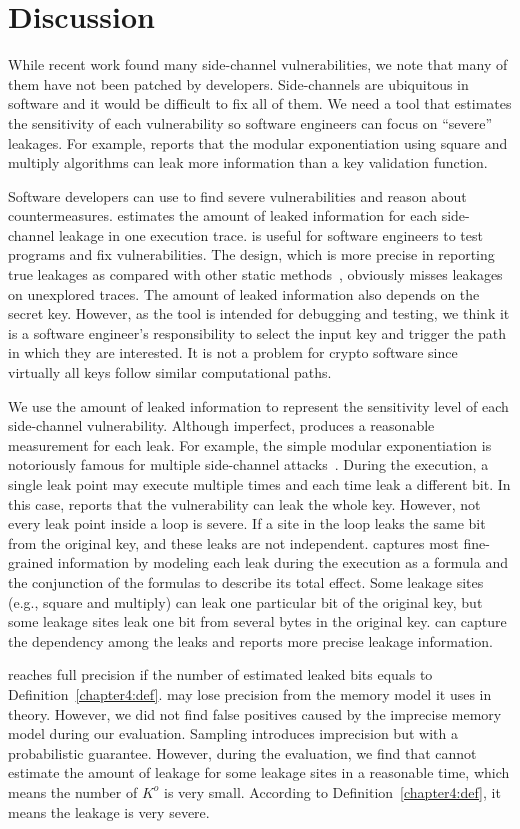 \section{Discussion}
While recent work found many side-channel vulnerabilities,
we note that many of them have not been patched by developers.
Side-channels are ubiquitous in software and it would be difficult to fix all of them.
We need a tool that estimates the sensitivity of each vulnerability
so software engineers can focus on
``severe'' leakages. For example, \tool{} reports that
the modular exponentiation using square and multiply algorithms can
leak more information than a key validation function.

Software developers can use \tool{} to find severe vulnerabilities
and reason about countermeasures.
\tool{} estimates the amount of leaked information for each side-channel leakage
in one execution trace. \tool{} is useful for software
engineers to test programs and fix vulnerabilities.
The design, which is more precise in reporting true leakages as compared with other static
methods~\cite{197207,BacelarAlmeida:2013:FVS:2483313.2483334}, obviously misses
leakages on unexplored traces. The amount of leaked information also depends on the secret key.
However, as the tool is intended for debugging and testing,
we think it is a software engineer's responsibility to select the input key and trigger
the path in which they are interested. It is not a problem for crypto software
since virtually all keys follow similar computational paths.

We use the amount of leaked information to represent the sensitivity level of
each side-channel vulnerability. Although imperfect, \tool{} produces a reasonable
measurement for each leak. For example, the simple modular exponentiation is
notoriously famous for multiple side-channel attacks~\cite{kocher1996timing}.
During the execution, a single leak point may execute multiple times
and each time leak a different bit. In this case, \tool{} reports that the
vulnerability can leak the whole key. However, not every leak point inside a
loop is severe. If a site in the loop leaks the same bit from the
original key, and these leaks are not independent. \tool{} captures most
fine-grained information by modeling each leak during the execution as a
formula and the conjunction of the formulas to describe its total effect.
Some leakage sites (e.g., square and multiply)
can leak one particular bit of the original key, but some leakage sites leak one bit
from several bytes in the original key. \tool{} can capture the dependency among the leaks and
reports more precise leakage information.

\tool{} reaches full precision if the number of estimated leaked bits
equals to Definition~\ref{chapter4:def}.
\tool{} may lose precision from the
memory model it uses in theory. However, we did not find false positives
caused by the imprecise memory model during our evaluation.
Sampling introduces imprecision but with a probabilistic guarantee.
However, during the evaluation, we find that \tool{} cannot estimate
the amount of leakage for some leakage sites in a reasonable time,
which means the number of $K^o$ is very small. According to Definition~\ref{chapter4:def}, it means the leakage is very severe. 